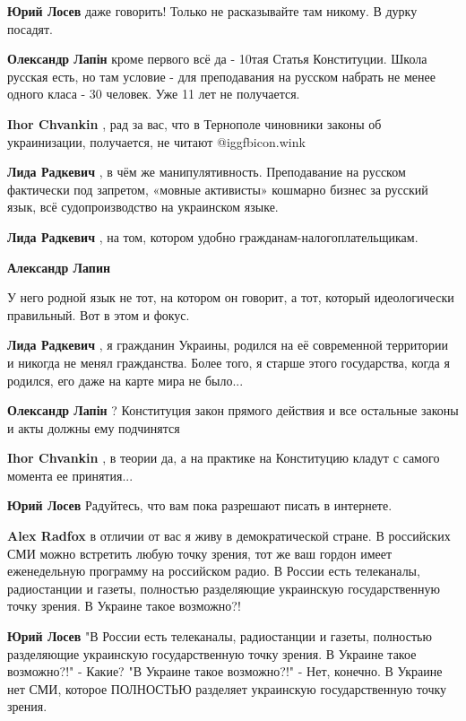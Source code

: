 \begin{itemize}
\begin{itemize}
\textbf{Юрий Лосев} даже говорить! Только не расказывайте там никому. В дурку посадят.

\textbf{Олександр Лапін} кроме первого всё да - 10тая Статья Конституции. Школа русская есть, но там условие - для преподавания на русском набрать не менее одного класа - 30 человек. Уже 11 лет не получается.

\textbf{Ihor Chvankin} , рад за вас, что в Тернополе чиновники законы об украинизации, получается, не читают  @igg{fbicon.wink} 

\textbf{Лида Радкевич} , в чём же манипулятивность. Преподавание на русском фактически под запретом, «мовные активисты» кошмарно бизнес за русский язык, всё судопроизводство на украинском языке.

\textbf{Лида Радкевич} , на том, котором удобно гражданам-налогоплательщикам.

\textbf{Александр Лапин} 

У него родной язык не тот, на котором он говорит, а тот, который идеологически
правильный. Вот в этом и фокус.

\textbf{Лида Радкевич} , я гражданин Украины, родился на её современной территории и никогда не менял гражданства. Более того, я старше этого государства, когда я родился, его даже на карте мира не было...

\textbf{Олександр Лапін} ? Конституция закон прямого действия и все остальные законы и акты должны ему подчинятся

\textbf{Ihor Chvankin} , в теории да, а на практике на Конституцию кладут с самого момента ее принятия...

\textbf{Юрий Лосев} Радуйтесь, что вам пока разрешают писать в интернете.

\textbf{Alex Radfox} в отличии от вас я живу в демократической стране. В российских СМИ можно встретить любую точку зрения, тот же ваш гордон имеет еженедельную программу на российском радио. В России есть телеканалы, радиостанции и газеты, полностью разделяющие украинскую государственную точку зрения. В Украине такое возможно?!

\textbf{Юрий Лосев} "В России есть телеканалы, радиостанции и газеты, полностью разделяющие украинскую государственную точку зрения. В Украине такое возможно?!" - Какие?
"В Украине такое возможно?!" - Нет, конечно. В Украине нет СМИ, которое ПОЛНОСТЬЮ разделяет украинскую государственную точку зрения.


\end{itemize}
\end{itemize}
